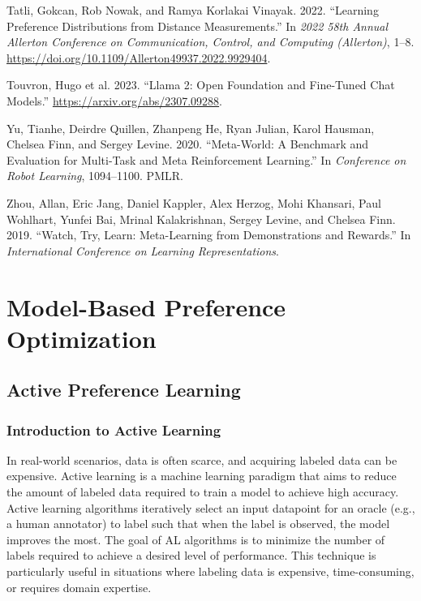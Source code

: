 \documentclass[
  letterpaper,
  numbers=noenddot,
  DIV=11]{scrreprt}
\newlength{\cslhangindent}
\newenvironment{CSLReferences}[2] %
 {\begin{list}{}{%
  \setlength{\itemindent}{0pt}
  \setlength{\leftmargin}{0pt}
  \setlength{\parsep}{0pt}
  \ifodd #1
   \setlength{\leftmargin}{\cslhangindent}
   \setlength{\itemindent}{-1\cslhangindent}
  \fi
  \setlength{\itemsep}{#2\baselineskip}}}
 {\end{list}}
\let\oldchapter\chapter
\def\chapter{%
  \setcounter{sidenote}{1}%
  \oldchapter
}
\theoremstyle{definition}
\theoremstyle{plain}
\theoremstyle{plain}
\theoremstyle{remark}
\begin{document}
\begin{CSLReferences}{1}{0}
Tatli, Gokcan, Rob Nowak, and Ramya Korlakai Vinayak. 2022. {``Learning
Preference Distributions from Distance Measurements.''} In \emph{2022
58th Annual Allerton Conference on Communication, Control, and Computing
(Allerton)}, 1--8.
\url{https://doi.org/10.1109/Allerton49937.2022.9929404}.

Touvron, Hugo et al. 2023. {``Llama 2: Open Foundation and Fine-Tuned
Chat Models.''} \url{https://arxiv.org/abs/2307.09288}.

Yu, Tianhe, Deirdre Quillen, Zhanpeng He, Ryan Julian, Karol Hausman,
Chelsea Finn, and Sergey Levine. 2020. {``Meta-World: A Benchmark and
Evaluation for Multi-Task and Meta Reinforcement Learning.''} In
\emph{Conference on Robot Learning}, 1094--1100. PMLR.

Zhou, Allan, Eric Jang, Daniel Kappler, Alex Herzog, Mohi Khansari, Paul
Wohlhart, Yunfei Bai, Mrinal Kalakrishnan, Sergey Levine, and Chelsea
Finn. 2019. {``Watch, Try, Learn: Meta-Learning from Demonstrations and
Rewards.''} In \emph{International Conference on Learning
Representations}.

\end{CSLReferences}


\chapter{Model-Based Preference Optimization}\label{ch-model-based}

\section{Active Preference Learning}\label{active-preference-learning}

\subsection{Introduction to Active
Learning}\label{introduction-to-active-learning}

In real-world scenarios, data is often scarce, and acquiring labeled
data can be expensive. Active learning is a machine learning paradigm
that aims to reduce the amount of labeled data required to train a model
to achieve high accuracy. Active learning algorithms iteratively select
an input datapoint for an oracle (e.g., a human annotator) to label such
that when the label is observed, the model improves the most. The goal
of AL algorithms is to minimize the number of labels required to achieve
a desired level of performance. This technique is particularly useful in
situations where labeling data is expensive, time-consuming, or requires
domain expertise.
\end{document}
